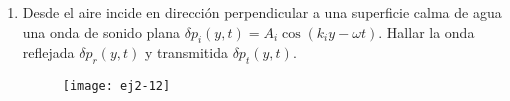 \documentclass[11pt,spanish,a4paper]{article}
\begin{document}
\begin{enumerate}
\item
Desde el aire incide en dirección perpendicular a una superficie calma de agua una onda de sonido plana $\delta p_i (y,t) = A_i \cos{\left( k_i y - \omega t \right)}$.
Hallar la onda reflejada $\delta p_{r}(y,t)$ y transmitida $\delta p_{t}(y,t)$.
\begin{figure}[ht]
\centering{}\texttt{[image: ej2-12]}
\end{figure}




\end{enumerate}
\end{document}
